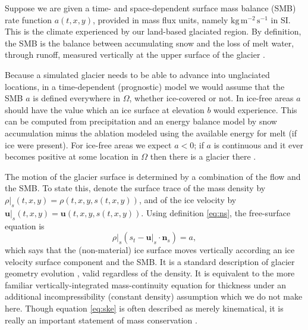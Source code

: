 \documentclass[11pt]{amsart}
\theoremstyle{definition}
\newcommand{\bn}{\mathbf{n}}
\newcommand{\bu}{\mathbf{u}}
\begin{document}
Suppose we are given a time- and space-dependent surface mass balance (SMB) rate function $a(t,x,y)$, provided in mass flux units, namely $\text{kg}\,\text{m}^{-2}\,\text{s}^{-1}$ in SI.  This is the climate experienced by our land-based glaciated region.  By definition, the SMB is the balance between accumulating snow and the loss of melt water, through runoff, measured vertically at the upper surface of the glacier \cite{Cogleyetal2011}.

Because a simulated glacier needs to be able to advance into unglaciated locations, in a time-dependent (prognostic) model we would assume that the SMB $a$ is defined everywhere in $\Omega$, whether ice-covered or not.  In ice-free areas $a$ should have the value which an ice surface at elevation $b$ would experience.  This can be computed from precipitation and an energy balance model \cite{GreveBlatter2009} by snow accumulation minus the ablation modeled using the available energy for melt (if ice were present).  For ice-free areas we expect $a<0$; if $a$ is continuous and it ever becomes positive at some location in $\Omega$ then there is a glacier there \cite[for example]{JouvetBueler2012}.

The motion of the glacier surface is determined by a combination of the flow and the SMB.  To state this, denote the surface trace of the mass density by $\rho|_s(t,x,y) = \rho(t,x,y,s(t,x,y))$, and of the ice velocity by $\bu|_s(t,x,y) = \bu(t,x,y,s(t,x,y))$.  Using definition \eqref{eq:ns}, the free-surface equation is
\begin{equation}
\rho|_s \left(s_t - \bu|_s \cdot \bn_s\right) = a,  \label{eq:ske}
\end{equation}  
which says that the (non-material) ice surface moves vertically according an ice velocity surface component and the SMB.  It is a standard description of glacier geometry evolution \cite{GreveBlatter2009,SchoofHewitt2013}, valid regardless of the density.  It is equivalent to the more familiar vertically-integrated mass-continuity equation for thickness \cite{Bueler2021conservation,GreveBlatter2009,JouvetBueler2012} under an additional incompressibility (constant density) assumption which we do not make here.  Though equation \eqref{eq:ske} is often described as merely kinematical, it is really an important statement of mass conservation \cite[Section 3.3]{Aschwandenetal2012}.
\end{document}
